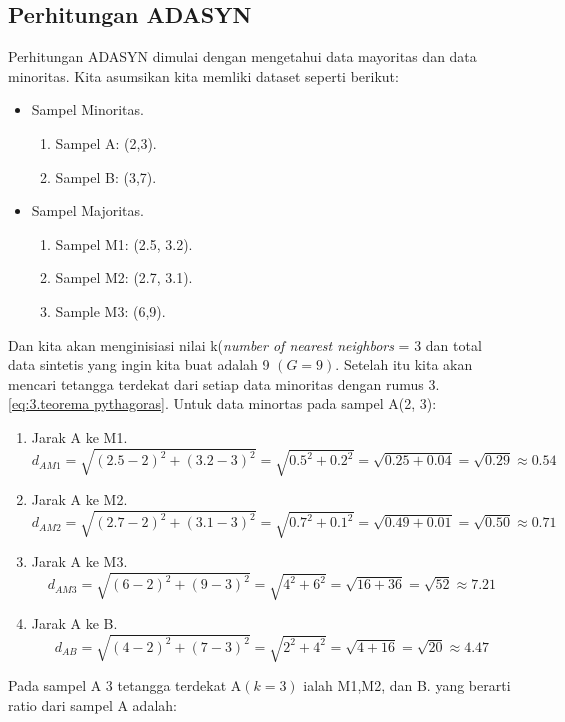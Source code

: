 \subsection{Perhitungan ADASYN}
Perhitungan ADASYN dimulai dengan mengetahui data mayoritas dan data minoritas. Kita asumsikan kita memliki dataset seperti berikut:
\begin{itemize}
	\item Sampel Minoritas.
		\begin{enumerate}
			\item Sampel A: (2,3).
			\item Sampel B: (3,7).
		\end{enumerate}
	\item Sampel Majoritas.
		\begin{enumerate}
			\item Sampel M1: (2.5, 3.2).
			\item Sampel M2: (2.7, 3.1).
			\item Sample M3: (6,9).
		\end{enumerate}
\end{itemize}
Dan kita akan menginisiasi nilai k(\textit{number of nearest neighbors} = 3 dan total data sintetis yang ingin kita buat adalah 9 $(G = 9)$. Setelah itu kita akan mencari tetangga terdekat dari setiap data minoritas dengan rumus 3.\ref{eq:3.teorema pythagoras}.
Untuk data minortas pada sampel A(2, 3):
\begin{enumerate}
	\item  Jarak A ke M1.\\
		$$
			d_{AM1} = \sqrt{(2.5-2)^2 + (3.2-3)^2} = \sqrt{0.5^2 + 0.2^2} = \sqrt{0.25 + 0.04} = \sqrt{0.29} \approx 0.54
		$$

	\item Jarak A ke M2.\\
		$$
			d_{AM2} = \sqrt{(2.7-2)^2 + (3.1-3)^2} = \sqrt{0.7^2 + 0.1^2} = \sqrt{0.49 + 0.01} = \sqrt{0.50} \approx 0.71 
		$$

	\item Jarak A ke M3.\\
		$$
			d_{AM3} = \sqrt{(6-2)^2 + (9-3)^2} = \sqrt{4^2 + 6^2} = \sqrt{16 + 36} = \sqrt{52} \approx 7.21 
		$$
		
	\item Jarak A ke B.\\
		$$
			d_{AB} = \sqrt{(4-2)^2 + (7-3)^2} = \sqrt{2^2 + 4^2} = \sqrt{4 + 16} = \sqrt{20} \approx 4.47 
		$$
\end{enumerate}
Pada sampel A 3 tetangga terdekat A$(k = 3)$ ialah M1,M2, dan B. yang berarti ratio dari sampel A adalah:

